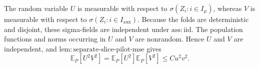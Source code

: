 The random variable \(U\) is measurable with respect to \(\sigma(Z_i:i\in I_\mu)\), whereas \(V\) is measurable with respect to \(\sigma(Z_i:i\in I_{\mathrm{aux}})\). Because the folds are deterministic and disjoint, these sigma-fields are independent under \(\mathrm{ass:iid}\). The population functions and norms occurring in \(U\) and \(V\) are nonrandom. Hence \(U\) and \(V\) are independent, and \(\mathrm{lem:separate\text{-}slice\text{-}pilot\text{-}mse}\) gives
\[
\mathbb E_P[U^2V^2]
=
\mathbb E_P[U^2]\mathbb E_P[V^2]
\le Cu^2v^2.
\]